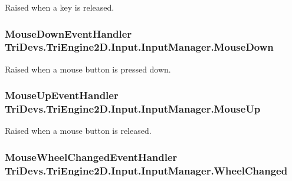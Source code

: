 Raised when a key is released. 

\hypertarget{class_tri_devs_1_1_tri_engine2_d_1_1_input_1_1_input_manager_ace382adcf111fddbf706f3b5cb6be1e5}{
\subsubsection[{Mouse\-Down}]{\setlength{\rightskip}{0pt plus 5cm}Mouse\-Down\-Event\-Handler Tri\-Devs.\-Tri\-Engine2\-D.\-Input.\-Input\-Manager.\-Mouse\-Down}}\label{class_tri_devs_1_1_tri_engine2_d_1_1_input_1_1_input_manager_ace382adcf111fddbf706f3b5cb6be1e5}


Raised when a mouse button is pressed down. 

\hypertarget{class_tri_devs_1_1_tri_engine2_d_1_1_input_1_1_input_manager_a6597ceeecf3e9426f52c3887eb91070d}{
\subsubsection[{Mouse\-Up}]{\setlength{\rightskip}{0pt plus 5cm}Mouse\-Up\-Event\-Handler Tri\-Devs.\-Tri\-Engine2\-D.\-Input.\-Input\-Manager.\-Mouse\-Up}}\label{class_tri_devs_1_1_tri_engine2_d_1_1_input_1_1_input_manager_a6597ceeecf3e9426f52c3887eb91070d}


Raised when a mouse button is released. 

\hypertarget{class_tri_devs_1_1_tri_engine2_d_1_1_input_1_1_input_manager_aee07353ac8a4e9c678ff48b571e09214}{
\subsubsection[{Wheel\-Changed}]{\setlength{\rightskip}{0pt plus 5cm}Mouse\-Wheel\-Changed\-Event\-Handler Tri\-Devs.\-Tri\-Engine2\-D.\-Input.\-Input\-Manager.\-Wheel\-Changed}}\label{class_tri_devs_1_1_tri_engine2_d_1_1_input_1_1_input_manager_aee07353ac8a4e9c678ff48b571e09214}


